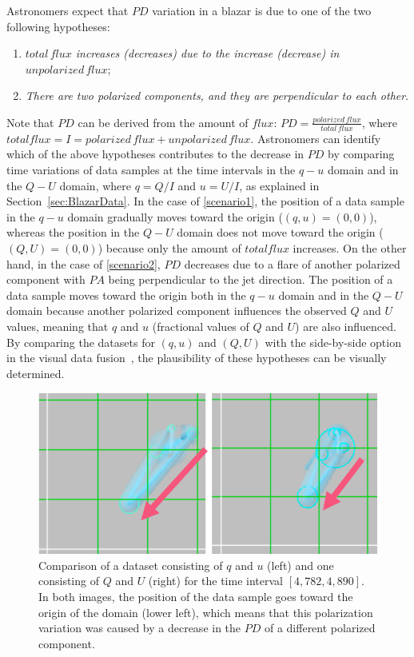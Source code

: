 Astronomers expect that $PD$ variation in a blazar is due to one of the two following hypotheses:
\begin{enumerate}[nosep, label=\textsl{Hypothesis \arabic*}:, ref=\textsl{Hypothesis \arabic*}, align=parleft, leftmargin=*]
    \item \textsl{$total\,flux$ increases (decreases) due to the increase (decrease) in $unpolarized\,flux$};  \label{scenario1}
    \item \textsl{There are two polarized components, and they are perpendicular to each other}. \label{scenario2}
\end{enumerate}
Note that $PD$ can be derived from the amount of $flux$: $PD = \frac{polarized\,flux}{total\,flux}$,
where $total flux = I = polarized\,flux + unpolarized\,flux$.
Astronomers can identify which of the above hypotheses contributes to the decrease in $PD$
by comparing time variations of data samples at the time intervals in the $q - u$ domain and in the $Q-U$ domain,
where $q = Q / I$ and $u = U / I$, as explained in Section~\ref{sec:BlazarData}.
In the case of \ref{scenario1}, the position of a data sample in the $q - u$ domain gradually moves toward the origin ($(q, u) = (0, 0)$),
whereas the position in the $Q-U$ domain does not move toward the origin ($(Q, U) = (0, 0)$)
because only the amount of $total flux$ increases.
On the other hand, in the case of \ref{scenario2}, 
$PD$ decreases due to a flare of another polarized component with $PA$ being perpendicular to the jet direction.
The position of a data sample moves toward the origin both in the $q - u$ domain and in the $Q - U$ domain 
because another polarized component influences the observed $Q$ and $U$ values, 
meaning that $q$ and $u$ (fractional values of $Q$ and $U$) are also influenced.
By comparing the datasets for $(q, u)$ and $(Q, U)$ with the side-by-side option in the visual data fusion~\cite{Fujishiro2018},
the plausibility of these hypotheses can be visually determined.
\begin{figure}[tb]
    \centering
    \includegraphics[width=.8\linewidth]{vgtc_journal_latex/figures/stokesComparisonLabel.png}
    \caption{Comparison of a dataset consisting of $q$ and $u$ (left) and one consisting of $Q$ and $U$ (right) for the time interval $[4{,}782, 4{,}890]$.
    In both images, the position of the data sample goes toward the origin of the domain (lower left), which means that this polarization variation was caused by a decrease in the $PD$ of a different polarized component.}
    \label{fig:comparisonQIUIvsQU}
\end{figure}

